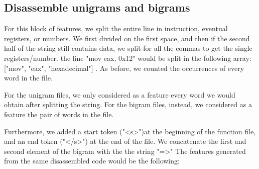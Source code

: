 \subsection{Disassemble unigrams and bigrams}
For this block of features, we split the entire line in instruction, eventual registers, or numbers. We first divided on the first space, and then if the second half of the string still contains data, we split for all the commas to get the single registers/number. the line "mov eax, 0x12" would be split in the following array: ["mov", "eax", "hexadecimal"] . As before, we counted the occurrences of every word in the file. 

For the unigram files, we only considered as a feature every word we would obtain after splitting the string. For the bigram files, instead, we considered as a feature the pair of words in the file. 

Furthermore, we added a start token ("<s>")at the beginning of the function file, and an end token ("</s>") at the end of the file. We concatenate the first and second element of the bigram with the the string "=>" The features generated from the same disassembled code would be the following: 

